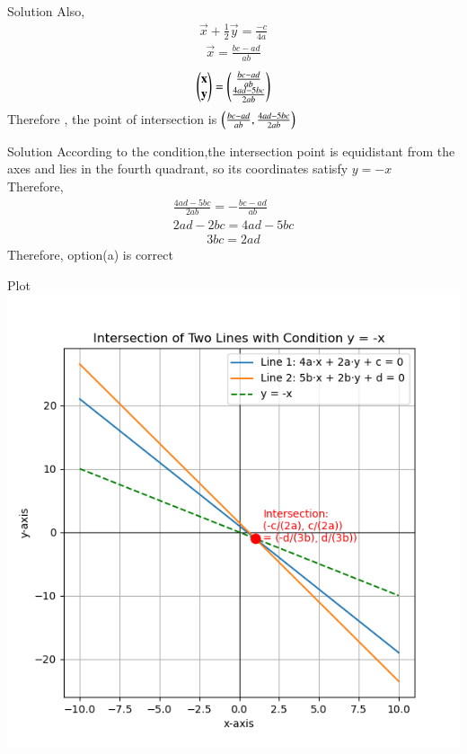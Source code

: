 \documentclass{beamer}
\begin{document}
\begin{frame}{Solution}
Also,
\begin{align}
\vec{x}+\frac{1}{2}\vec{y}=\frac{-c}{4a}
\end{align}
\begin{align}
\vec{x}=\frac{bc-ad}{ab}
\end{align}
\begin{align}
\begin{pmatrix}\mathbf{x}\\\mathbf{y}\end{pmatrix}=\begin{pmatrix}\frac{bc-ad}{ab}\\\frac{4ad-5bc}{2ab}\end{pmatrix}
\end{align}
Therefore , the point of intersection is $\left(\frac{bc-ad}{ab},\frac{4ad-5bc}{2ab}\right)$
\end{frame}
\begin{frame}{Solution}
According to the condition,the intersection point is equidistant from the axes and lies in the fourth quadrant, so its coordinates satisfy $y=-x$ \\
Therefore,
\begin{align}
\frac{4ad-5bc}{2ab}=-\frac{bc-ad}{ab}\\
2ad-2bc=4ad-5bc
\end{align}
\begin{align}
3bc=2ad
\end{align}
Therefore, option(a) is correct
\end{frame}
\begin{frame}{Plot}
    \centering
    \includegraphics[width=3\columnwidth, height=0.8\textheight, keepaspectratio]{figs/fig.png}     
\end{frame}
\end{document}
